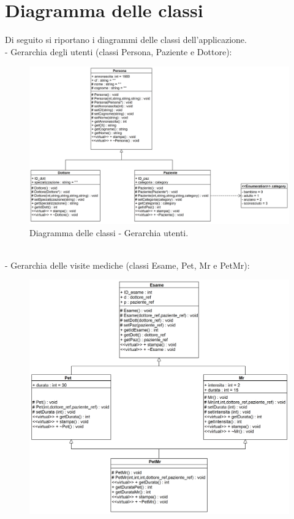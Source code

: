 \documentclass[a4paper,12pt]{article}
\begin{document}
{\section*{Diagramma delle classi}
Di seguito si riportano i diagrammi delle classi dell’applicazione. \\
- Gerarchia degli utenti (classi Persona, Paziente e Dottore):\\
\begin{figure}[h]
 \centering
 \includegraphics[width=\columnwidth]{diagrammiClassi/gerarchiaPersone}
 \caption{Diagramma delle classi - Gerarchia utenti.}
\end{figure}
\\
\newpage
- Gerarchia delle visite mediche (classi Esame, Pet, Mr e PetMr):\\
\begin{figure}[h]
 \centering
 \includegraphics[width=\columnwidth]{diagrammiClassi/gerarchiaEsami}

\end{figure}}
\end{document}
